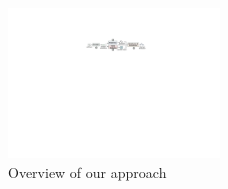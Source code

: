 



\begin{figure}[t!]
\begin{center}
\includegraphics[width=0.5\textwidth]{figures/overview.pdf}	
\caption{Overview of our approach}
\label{fig: denoise_framework}
\end{center}
\end{figure}


